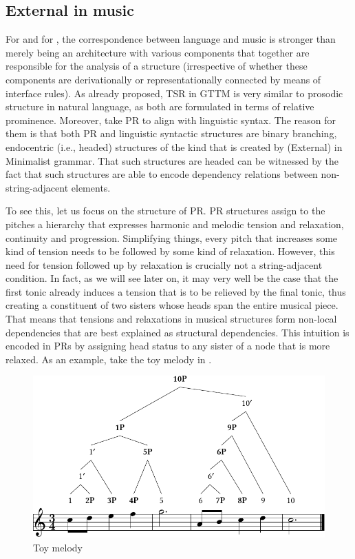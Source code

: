 \documentclass[output=paper]{langsci/langscibook}
\begin{document}
\subsection{External  in music}\label{sec:26.3.2}

For \citeauthor{LerJac1983} and for \citeauthor{KatzPes2011}, the
correspondence between language and music is stronger than merely being an
architecture with various components that together are responsible for the
analysis of a structure (irrespective of whether these components are
derivationally or representationally connected by means of interface rules). As
\citeauthor{LerJac1983} already proposed, \gls{TSR} in \gls{GTTM} is very similar to prosodic structure in natural
language, as both are formulated in terms of relative prominence. Moreover,
\citeauthor{KatzPes2011} take \gls{PR} to align with linguistic syntax.  The
reason for them is that both \gls{PR} and linguistic syntactic structures are
binary branching, endocentric (i.e., headed) structures of the kind that is
created by (External)  in Minimalist grammar. That such structures
are headed can be witnessed by the fact that such structures are able to encode
dependency relations between non-string-adjacent elements.

To see this, let us focus on the structure of \gls{PR}. \gls{PR} structures
assign to the pitches a hierarchy that expresses harmonic and melodic tension
and relaxation, continuity and progression. Simplifying things, every pitch
that increases some kind of tension needs to be followed by some kind of
relaxation. However, this need for tension followed up by relaxation is
crucially not a string-adjacent condition. In fact, as we will see later on, it
may very well be the case that the first tonic already induces a tension that
is to be relieved by the final tonic, thus creating a constituent of two
sisters whose heads span the entire musical piece. That means that tensions and
relaxations in musical structures form non-local dependencies that are best
explained as structural dependencies.  This intuition is encoded in \glspl{PR}
by assigning head status to any sister of a node that is more relaxed. 
As an example, take the toy melody in .

\begin{figure}
\caption{\label{bkm:Ref348696475}Toy melody
\parencite[16]{KatzPes2011}}
\includegraphics[width=\textwidth]{./img/28-7.pdf}
\end{figure}
\end{document}
